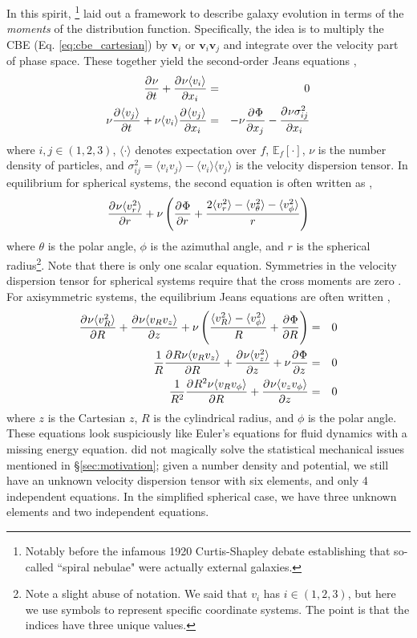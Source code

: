 In this spirit, \citet{jeans_1915}\footnote{Notably before the infamous 1920 Curtis-Shapley debate \citep{curtis_shapley} establishing that so-called ``spiral nebulae" were actually external galaxies.} laid out a framework to describe galaxy evolution in terms of the \textit{moments} of the distribution function. Specifically, the idea is to multiply the CBE (Eq. \eqref{eq:cbe_cartesian}) by $\textbf{v}_i$ or $\textbf{v}_i \textbf{v}_j$ and integrate over the velocity part of phase space. These together yield the second-order Jeans equations \citep{BT},
\begin{eqnarray}
\frac{\partial^{} {\nu}}{\partial {t}^{}} + \frac{\partial^{} {\nu \langle v_i \rangle}}{\partial {x_i}^{}} &=& 0 \\
\nu \frac{\partial^{} {\langle v_j \rangle}}{\partial {t}^{}} + \nu \langle v_i \rangle \frac{\partial^{} {\langle v_j \rangle}}{\partial {x_i}^{}} &=& -\nu \frac{\partial^{} {\Phi}}{\partial {x_j}^{}} - \frac{\partial^{} {\nu \sigma^2_{ij}}}{\partial {x_i}^{}}\label{eq:jeans}
\end{eqnarray}
where $i,j \in (1,2,3)$, $\langle\cdot\rangle$ denotes expectation over $f$, $\mathbb{E}_f[\cdot]$, $\nu$ is the number density of particles, and $\sigma^2_{ij} = \langle v_i v_j \rangle - \langle v_i \rangle \langle v_j \rangle$ is the velocity dispersion tensor. In equilibrium for spherical systems, the second equation is often written as \citep{BT},
\begin{equation}
\frac{\partial^{} {\nu \langle v_r^2 \rangle}}{\partial {r}^{}} + \nu \left(\frac{\partial^{} {\Phi}}{\partial {r}^{}} + \frac{2 \langle v_r^2 \rangle - \langle v_\theta^2\rangle - \langle v_\phi^2 \rangle}{r} \right)
\end{equation}
where $\theta$ is the polar angle, $\phi$ is the azimuthal angle, and $r$ is the spherical radius\footnote{Note a slight abuse of notation. We said that $v_i$ has $i \in (1,2,3)$, but here we use symbols to represent specific coordinate systems. The point is that the indices have three unique values.}. Note that there is only one scalar equation. Symmetries in the velocity dispersion tensor for spherical systems require that the cross moments are zero \citep{BT}. For axisymmetric systems, the equilibrium Jeans equations are often written \citep{BT},
\begin{eqnarray}
\frac{\partial^{} {\nu \langle v_R^2 \rangle}}{\partial {R}^{}} + \frac{\partial^{} {\nu \langle v_R v_z \rangle}}{\partial {z}^{}} + \nu \left(\frac{\langle v_R^2 \rangle - \langle v_\phi^2 \rangle}{R} + \frac{\partial^{} {\Phi}}{\partial {R}^{}} \right) &=& 0\\
\frac{1}{R} \frac{\partial^{} {R \nu \langle v_R v_z \rangle}}{\partial {R}^{}} + \frac{\partial^{} {\nu \langle v_z^2 \rangle}}{\partial {z}^{}}+ \nu \frac{\partial^{} {\Phi}}{\partial {z}^{}} &=& 0\\
\frac{1}{R^2} \frac{\partial^{} {R^2 \nu \langle v_R v_\phi \rangle}}{\partial {R}^{}} + \frac{\partial^{} {\nu \langle v_z v_\phi\rangle}}{\partial {z}^{}} &=& 0
\end{eqnarray}
where $z$ is the Cartesian $z$, $R$ is the cylindrical radius, and $\phi$ is the polar angle. These equations look suspiciously like Euler's equations for fluid dynamics with a missing energy equation. \citet{jeans_1915} did not magically solve the statistical mechanical issues mentioned in \S\ref{sec:motivation}; given a number density and potential, we still have an unknown velocity dispersion tensor with six elements, and only 4 independent equations. In the simplified spherical case, we have three unknown elements and two independent equations.

